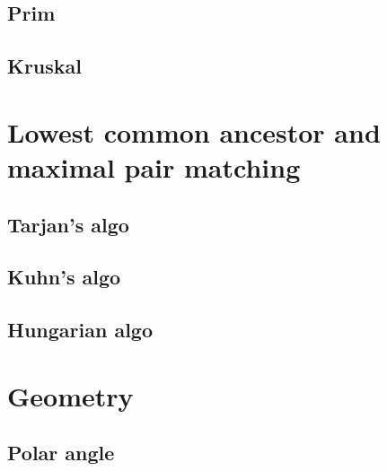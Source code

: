 \documentclass[12pt,a4paper]{article}
\begin{document}


\subsection{Prim}



\subsection{Kruskal}



\section{Lowest common ancestor and maximal pair matching}

\subsection{Tarjan's algo}



\subsection{Kuhn's algo}



\subsection{Hungarian algo}



\section{Geometry}

\subsection{Polar angle}
\end{document}
